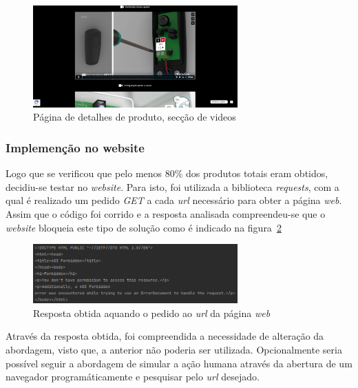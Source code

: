 \begin{figure}[htb]
  \centering
  
  \includegraphics[width=0.7\textwidth]{images/implementacao/scraper/pagina_detalhes_videos.png}
  \caption{Página de detalhes de produto, secção de videos}
  \label{fig:55}
\end{figure}

\newpage

\subsubsection{Implemenção no website}

Logo que se verificou que pelo menos 80\% dos produtos totais eram obtidos, decidiu-se testar no \textit{website}. Para isto, foi utilizada a biblioteca \textit{requests}, com a qual é realizado um pedido \textit{GET} a cada \textit{url} necessário para obter a página \textit{web}. Assim que o código foi corrido e a resposta analisada compreendeu-se que o \textit{website} bloqueia este tipo de solução como é indicado na figura~\ref{fig:56}

\begin{figure}[htb]
  \centering
  \includegraphics[width=0.7\textwidth]{images/implementacao/scraper/forbiden_response.png}
  \caption{Resposta obtida aquando o pedido ao \textit{url} da página \textit{web}}
  \label{fig:56}
\end{figure}

Através da resposta obtida, foi compreendida a necessidade de alteração da abordagem, visto que, a anterior não poderia ser utilizada. Opcionalmente seria possível seguir a abordagem de simular a ação humana através da abertura de um navegador programáticamente e pesquisar pelo \textit{url} desejado. 

